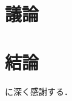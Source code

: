 \documentclass[dvipdfmx]{ampbt_nomag}
\def\numberofspines{1}
\begin{document}
\section{議論}\label{sec-discussion}

\section{結論}\label{sec-conclusion}



\acknowledgment
に深く感謝する．




\appendix


\fi
\ifoutputcover
\cleardoublepage
\makecover                      %
\makespine[\numberofspines]     %
\fi
\ifoutputabstractforsubmission
\makeabstractforsubmission      %
\fi
\end{document}
